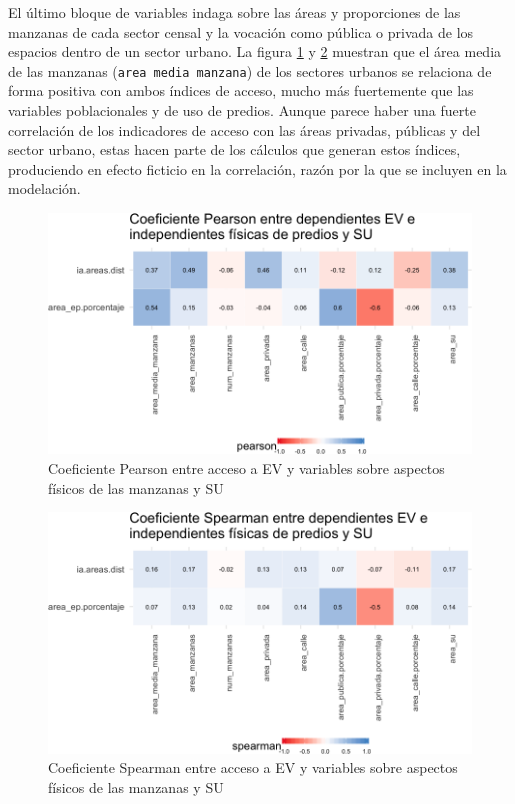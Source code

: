 \documentclass[12pt,a4paper,openany]{book}
\theoremstyle{definition}
\theoremstyle{definition}
\theoremstyle{definition}
\theoremstyle{remark}
\begin{document}
El último bloque de variables indaga sobre las áreas y proporciones de
las manzanas de cada sector censal y la vocación como pública o privada
de los espacios dentro de un sector urbano. La figura
\ref{fig:tile-ev-fisica-pearson} y \ref{fig:tile-ev-fisica-spearman}
muestran que el área media de las manzanas
(\texttt{area\ media\ manzana}) de los sectores urbanos se relaciona de
forma positiva con ambos índices de acceso, mucho más fuertemente que
las variables poblacionales y de uso de predios. Aunque parece haber una
fuerte correlación de los indicadores de acceso con las áreas privadas,
públicas y del sector urbano, estas hacen parte de los cálculos que
generan estos índices, produciendo en efecto ficticio en la correlación,
razón por la que se incluyen en la modelación.

\begin{figure}

{\centering \includegraphics[width=1\linewidth]{tesis-unigis_files/figure-latex/tile-ev-fisica-pearson-1} 

}

\caption{Coeficiente Pearson entre acceso a EV y variables sobre aspectos físicos de las manzanas y SU}\label{fig:tile-ev-fisica-pearson}
\end{figure}

\begin{figure}

{\centering \includegraphics[width=1\linewidth]{tesis-unigis_files/figure-latex/tile-ev-fisica-spearman-1} 

}

\caption{Coeficiente Spearman entre acceso a EV y variables sobre aspectos físicos de las manzanas y SU}\label{fig:tile-ev-fisica-spearman}
\end{figure}
\end{document}
